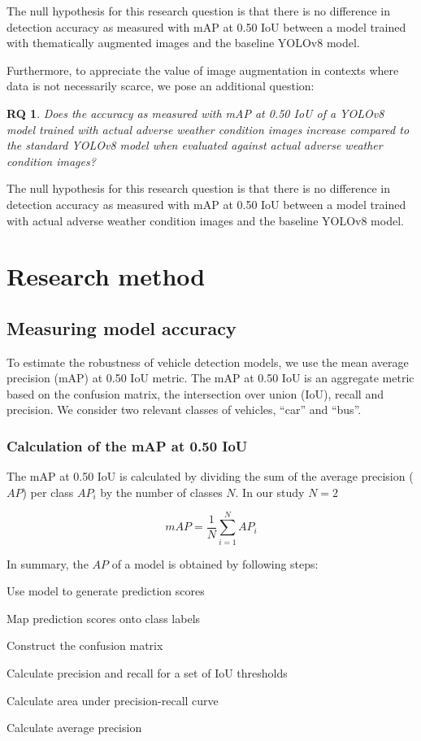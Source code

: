 \documentclass[]{article}
\newtheorem{researchquestion}{RQ}
\begin{document}
	The null hypothesis for this research question is that there is no difference in detection accuracy as measured with mAP at 0.50 IoU between a model trained with thematically augmented images and the baseline YOLO\small{v8} model.

	Furthermore, to appreciate the value of image augmentation in contexts where data is not necessarily scarce, we pose an additional question:
	\begin{researchquestion}
		\label{rq2}
		Does the accuracy as measured with mAP at 0.50 IoU of a YOLO{\small v8} model trained with actual adverse weather condition images increase compared to the standard YOLO{\small v8} model when evaluated against actual adverse weather condition images?
	\end{researchquestion}

	The null hypothesis for this research question is that there is no difference in detection accuracy as measured with mAP at 0.50 IoU between a model trained with actual adverse weather condition images and the baseline YOLO\small{v8} model.

\section{Research method}
\subsection{Measuring model accuracy}

	To estimate the robustness of vehicle detection models, we use the mean average precision (mAP) at 0.50 IoU metric. The mAP at 0.50 IoU is an aggregate metric based on the confusion matrix, the intersection over union (IoU), recall and precision. We consider two relevant classes of vehicles, ``car'' and ``bus''.

\subsubsection{Calculation of the mAP at 0.50 IoU}

	The mAP at 0.50 IoU is calculated by dividing the sum of the average precision ($AP$) per class $AP_i$ by the number of classes $N$.  In our study $N = 2$
	
	\[
	mAP = \frac{1}{N} \sum_{i=1}^{N} AP_i
	\]

	In summary, the $AP$ of a model is obtained by following steps:

	\begin{center}
		\begin{compactenum}
			\item Use model to generate prediction scores
			\item Map prediction scores onto class labels
			\item Construct the confusion matrix
			\item Calculate precision and recall for a set of IoU thresholds
			\item Calculate area under precision-recall curve
			\item Calculate average precision
		\end{compactenum}
	\end{center}
	
\end{document}
